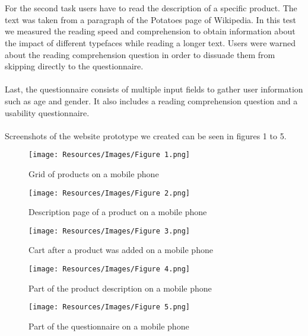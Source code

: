 \documentclass{article}
\begin{document}
\\
\\
For the second task users have to read the description of a specific product. The text was taken from a paragraph of the Potatoes page of Wikipedia. In this test we measured the reading speed and comprehension to obtain information about the impact of different typefaces while reading a longer text. Users were warned about the reading comprehension question in order to dissuade them from skipping directly to the questionnaire. 
\\
\\
Last, the questionnaire consists of multiple input fields to gather user information such as age and gender. It also includes a reading comprehension question and a usability questionnaire.
\\
\\
Screenshots of the website prototype we created can be seen in figures 1 to 5.

\begin{figure}[H]
\centering
\texttt{[image: Resources/Images/Figure 1.png]}
\caption{Grid of products on a mobile phone}
\end{figure}

\begin{figure}[H]
\centering
\texttt{[image: Resources/Images/Figure 2.png]}
\caption{Description page of a product on a mobile phone}

\end{figure}

\begin{figure}[H]
\centering
\texttt{[image: Resources/Images/Figure 3.png]}
\caption{Cart after a product was added on a mobile phone}
\end{figure}

\begin{figure}[H]
\centering
\texttt{[image: Resources/Images/Figure 4.png]}
\caption{Part of the product description on a mobile phone}
\end{figure}

\begin{figure}[H]
\centering
\texttt{[image: Resources/Images/Figure 5.png]}
\caption{Part of the questionnaire on a mobile phone}
\end{figure}
\end{document}
